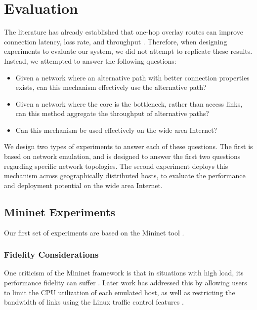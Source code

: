\documentclass{cwru}
\begin{document}
\chapter{Evaluation}
\label{c:eval}

The literature has already established that one-hop overlay routes can improve
connection latency, loss rate, and throughput
\cite{detour,ron,gummadi2004improving}. Therefore, when designing experiments to
evaluate our system, we did not attempt to replicate these results. Instead, we
attempted to answer the following questions:

\begin{itemize}
\item Given a network where an alternative path with better connection
  properties exists, can this mechanism effectively use the alternative path?
\item Given a network where the core is the bottleneck, rather than access
  links, can this method aggregate the throughput of alternative paths?
\item Can this mechanism be used effectively on the wide area Internet?
\end{itemize}

We design two types of experiments to answer each of these questions. The first
is based on network emulation, and is designed to answer the first two questions
regarding specific network topologies. The second experiment deploys this
mechanism across geographically distributed hosts, to evaluate the performance
and deployment potential on the wide area Internet.

\section{Mininet Experiments}

Our first set of experiments are based on the Mininet tool \cite{mininet}.

\subsection{Fidelity Considerations}

One criticism of the Mininet framework is that in situations with high load, its
performance fidelity can suffer \cite{lantz2010network}. Later work has
addressed this by allowing users to limit the CPU utilization of each emulated
host, as well as restricting the bandwidth of links using the Linux traffic
control features \cite{handigol2012reproducible}.
\end{document}
